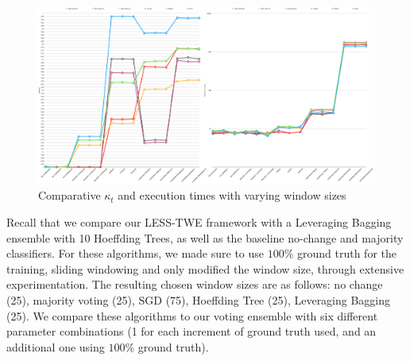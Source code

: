 \documentclass[runningheads]{llncs}
\begin{document}
\begin{figure}
  \includegraphics[width=\linewidth]{./images/chapter5/compare_sota}
\caption{\label{fig:raw_compare_sota} Comparative $\kappa_t$ and execution times with varying window sizes}
\end{figure}

Recall that we compare our LESS-TWE framework with a Leveraging Bagging ensemble with 10 Hoeffding Trees, as well as the baseline no-change and majority classifiers. For these algorithms, we made sure to use $100\%$ ground truth for the training, sliding windowing and only modified the window size, through extensive experimentation. The resulting chosen window sizes are as follows: no change (25),  majority voting (25), SGD (75), Hoeffding Tree (25), Leveraging Bagging (25). We  compare these algorithms to our voting ensemble with six different parameter combinations (1 for each increment of ground truth used, and an additional one using $100\%$ ground truth).




\end{document}
